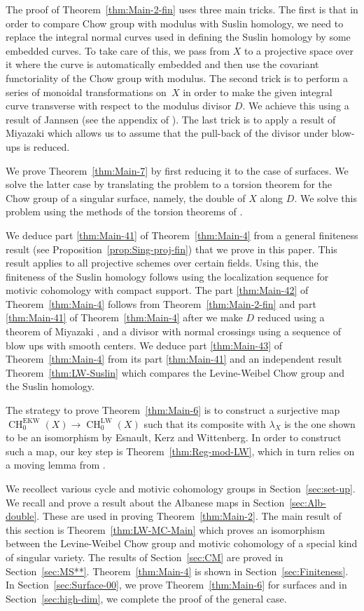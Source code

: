 \documentclass[11pt]{article}
\numberwithin{equation}{section}
\newcommand{\EKW}{\mathrm{EKW}}
\newcommand{\LW}{\mathrm{LW}}
\theoremstyle{definition}
\newcommand{\thmref}{Theorem~\ref}
\newcommand{\propref}{Proposition~\ref}
\newcommand{\secref}{Section~\ref}
\DeclareMathOperator{\CH}{CH}
\begin{document}
The proof of \thmref{thm:Main-2-fin} uses three main tricks. The first is
that in order to compare Chow group with modulus with Suslin homology,
we need to replace the integral normal curves used in defining the
Suslin homology by some embedded curves. To take care of this,
we pass from $X$ to a projective space over it where the curve is automatically
embedded and then use the covariant functoriality of the Chow group with
modulus. The second trick is to perform a series of monoidal transformations on~$X$ in order to make the given integral curve transverse with respect to
the modulus divisor $D$. We achieve this using a result of
Jannsen (see the appendix of \cite{SaitoSatoAnnals}).
The last trick is to apply a result of Miyazaki \cite{Miyazaki}
which allows us to assume that the pull-back of the divisor under blow-ups is reduced.

We prove \thmref{thm:Main-7} by first reducing it to the case of surfaces.
We solve the latter case by translating the problem to a
torsion theorem for the Chow group of a singular surface, namely, the double of
$X$ along $D$. We solve this problem using the methods of the torsion theorems
of \cite{Krishna-2}.

We deduce part \eqref{thm:Main-41} of \thmref{thm:Main-4} from a general finiteness result
(see \propref{prop:Sing-proj-fin}) that we prove in this paper.
This result applies to all projective schemes over certain fields.
Using this, the finiteness of the Suslin homology follows using the
localization sequence for motivic cohomology with compact support.
The part \eqref{thm:Main-42} of \thmref{thm:Main-4} follows from
\thmref{thm:Main-2-fin} and part \eqref{thm:Main-41} of \thmref{thm:Main-4} after we make
$D$ reduced using a theorem of Miyazaki \cite{Miyazaki}, and a divisor with
normal crossings using a sequence of blow ups with smooth centers.
We deduce part \eqref{thm:Main-43} of \thmref{thm:Main-4} from its part \eqref{thm:Main-41} and
an independent result \thmref{thm:LW-Suslin} which compares the Levine-Weibel
Chow group and the Suslin homology.

The strategy to prove \thmref{thm:Main-6} is to construct a surjective map
$\CH^{\EKW}_0(X) \to \CH^{\LW}_0(X)$ such that its composite with
$\lambda_X$ is the one shown to be an isomorphism by Esnault, Kerz and
Wittenberg. In order to construct such a map, our key step is
\thmref{thm:Reg-mod-LW}, which in turn relies on a moving lemma from
\cite{BK}.

We recollect various cycle and motivic cohomology groups in
\secref{sec:set-up}. We recall and prove a result about the
Albanese maps in \secref{sec:Alb-double}. These are used in
proving \thmref{thm:Main-2}. The main result of this section is
\thmref{thm:LW-MC-Main} which proves an isomorphism between
the Levine-Weibel Chow group and motivic cohomology of a
special kind of singular variety.
The results of \secref{sec:CM} are proved in
\secref{sec:MS**}. \thmref{thm:Main-4} is shown in \secref{sec:Finiteness}.
In \secref{sec:Surface-00}, we prove
\thmref{thm:Main-6} for surfaces and in \secref{sec:high-dim},
we complete the proof of the general case.
\end{document}
